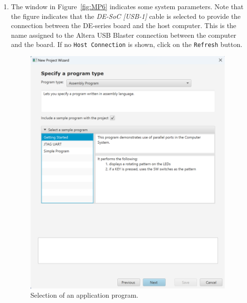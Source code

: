 \documentclass[epsfig,10pt,fullpage]{article}
\begin{document}
\begin{enumerate}
\item The window in Figure~\ref{fig:MP6} indicates some system parameters.
Note that the figure indicates that the {\it DE-SoC [USB-1]} cable is selected to provide 
the connection between the DE-series board and the host computer.  This is the name assigned 
to the Altera USB Blaster connection between the computer and the board.  
If no \texttt{Host Connection} is shown, click on the \texttt{Refresh} button. 


\begin{figure}[H]
	\begin{center}
	\includegraphics[scale=0.3]{figures/Snap4.png}
	\end{center}
	\caption{Selection of an application program.}
\label{fig:MP4}
\end{figure}


\end{enumerate}
\end{document}

